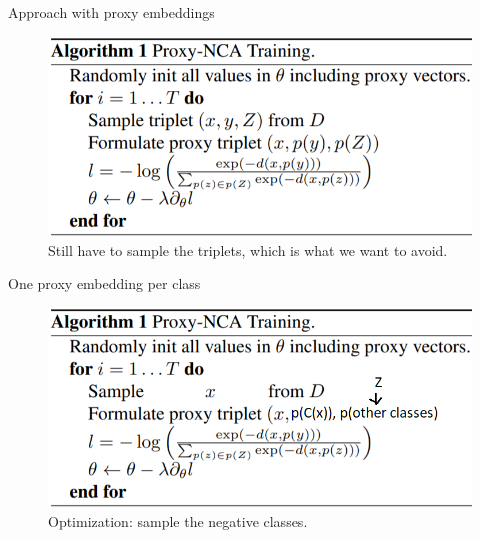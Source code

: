 \documentclass{beamer}
\begin{document}
\begin{frame}{Approach with proxy embeddings}

\begin{figure}[h]
\includegraphics[width=\textwidth]{img/alg1}
\caption{Still have to sample the triplets, which is what we want to avoid.}
\end{figure}

\end{frame}

\begin{frame}{One proxy embedding per class}

\begin{figure}[h]
\includegraphics[width=\textwidth]{img/alg1_mine}
\caption{Optimization: sample the negative classes. \cite{cit:subsample}}
\end{figure}

\end{frame}

\end{document}
